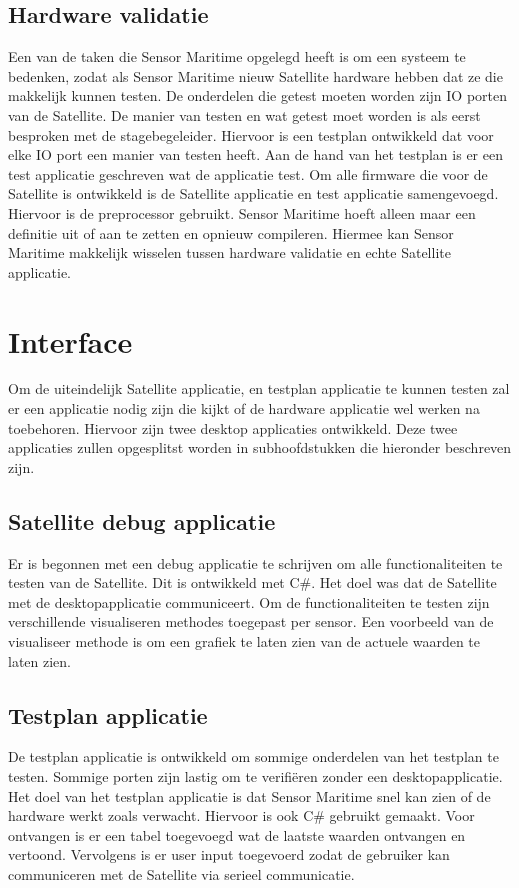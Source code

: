 \subsection{Hardware validatie}
Een van de taken die Sensor Maritime opgelegd heeft is om een systeem te bedenken, zodat als Sensor Maritime nieuw Satellite hardware hebben dat ze die makkelijk kunnen testen. De onderdelen die getest moeten worden zijn IO porten van de Satellite. De manier van testen en wat getest moet worden is als eerst besproken met de stagebegeleider. Hiervoor is een testplan ontwikkeld dat voor elke IO port een manier van testen heeft. Aan de hand van het testplan is er een test applicatie geschreven wat de applicatie test. Om alle firmware die voor de Satellite is ontwikkeld is de Satellite applicatie en test applicatie samengevoegd. Hiervoor is de preprocessor gebruikt. Sensor Maritime hoeft alleen maar een definitie uit of aan te zetten en opnieuw compileren. Hiermee kan Sensor Maritime makkelijk wisselen tussen hardware validatie en echte Satellite applicatie.

\section{Interface}
Om de uiteindelijk Satellite applicatie, en testplan applicatie te kunnen testen zal er een applicatie nodig zijn die kijkt of de hardware applicatie wel werken na toebehoren. Hiervoor zijn twee desktop applicaties ontwikkeld. Deze twee applicaties zullen opgesplitst worden in subhoofdstukken die hieronder beschreven zijn.

\subsection{Satellite debug applicatie}
Er is begonnen met een debug applicatie te schrijven om alle functionaliteiten te testen van de Satellite. Dit is ontwikkeld met C\#. Het doel was dat de Satellite met de desktopapplicatie communiceert. Om de functionaliteiten te testen zijn verschillende visualiseren methodes toegepast per sensor. Een voorbeeld van de visualiseer methode is om een grafiek te laten zien van de actuele waarden te laten zien. 

\subsection{Testplan applicatie}
De testplan applicatie is ontwikkeld om sommige onderdelen van het testplan te testen. Sommige porten zijn lastig om te verifiëren zonder een desktopapplicatie. Het doel van het testplan applicatie is dat Sensor Maritime snel kan zien of de hardware werkt zoals verwacht. Hiervoor is ook C\# gebruikt gemaakt. Voor ontvangen is er een tabel toegevoegd wat de laatste waarden ontvangen en vertoond. Vervolgens is er user input toegevoerd zodat de gebruiker kan communiceren met de Satellite via serieel communicatie.

